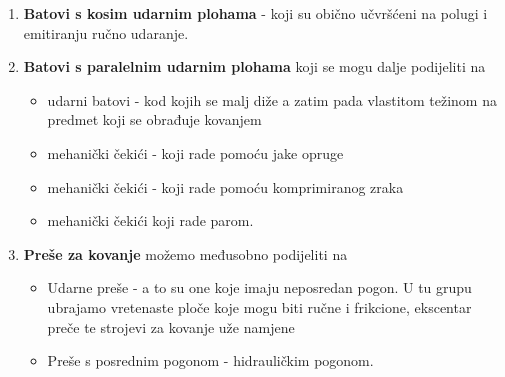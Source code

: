 \documentclass[a4paper,12pt]{article}
\numberwithin{figure}{section}
\begin{document}
\begin{enumerate}
\item \textbf{Batovi s kosim udarnim plohama} - koji su obično učvršćeni na polugi i emitiranju ručno udaranje.
\item \textbf{Batovi s paralelnim udarnim plohama} koji se mogu dalje podijeliti na 
\begin{itemize}
\item udarni batovi - kod kojih se malj diže a zatim pada vlastitom težinom na predmet koji se obrađuje kovanjem
\item mehanički čekići - koji rade pomoću jake opruge
\item mehanički čekići - koji rade pomoću komprimiranog zraka
\item mehanički čekići koji rade parom.
\end{itemize}
\item \textbf{Preše za kovanje} možemo međusobno podijeliti na 
\begin{itemize}
\item Udarne preše - a to su one koje imaju neposredan pogon. U tu grupu ubrajamo vretenaste ploče koje mogu biti ručne i frikcione, ekscentar preče te strojevi za kovanje uže namjene
\item Preše s posrednim pogonom - hidrauličkim pogonom.
\end{itemize}
\end{enumerate}
\end{document}
